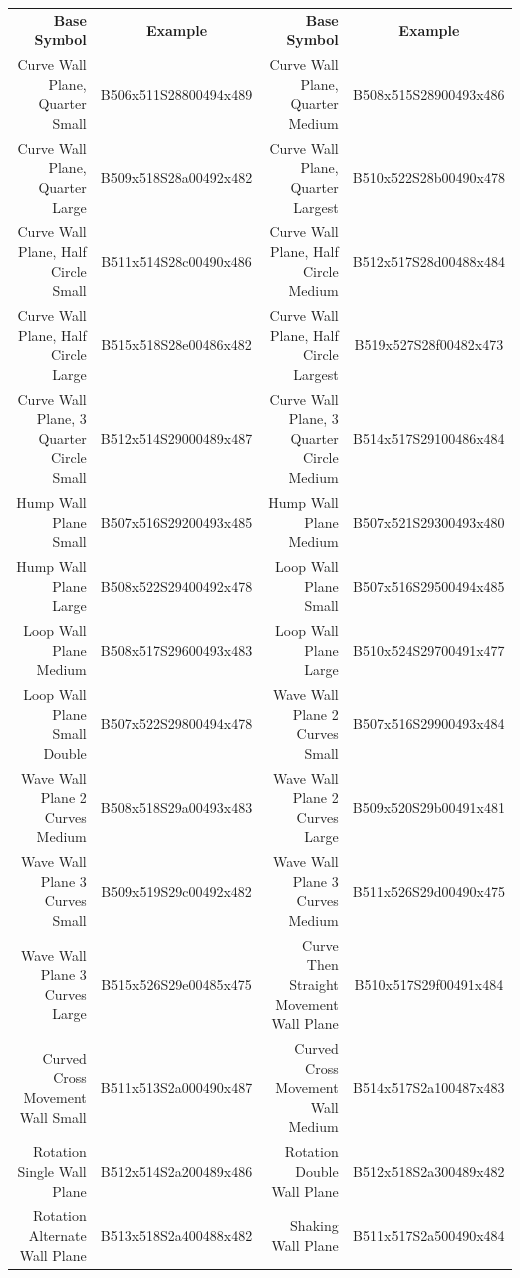 \documentclass{article}
\begin{document}
\begin{center}
\begin{tabular}{rcrc}
\textbf{Base Symbol}&\textbf{Example}&\textbf{Base Symbol}&\textbf{Example}\\
Curve Wall Plane, Quarter Small         &B506x511S28800494x489&Curve Wall Plane, Quarter Medium         &B508x515S28900493x486\\
Curve Wall Plane, Quarter Large         &B509x518S28a00492x482&Curve Wall Plane, Quarter Largest        &B510x522S28b00490x478\\
Curve Wall Plane, Half Circle Small     &B511x514S28c00490x486&Curve Wall Plane, Half Circle Medium     &B512x517S28d00488x484\\
Curve Wall Plane, Half Circle Large     &B515x518S28e00486x482&Curve Wall Plane, Half Circle Largest    &B519x527S28f00482x473\\
Curve Wall Plane, 3 Quarter Circle Small&B512x514S29000489x487&Curve Wall Plane, 3 Quarter Circle Medium&B514x517S29100486x484\\
Hump Wall Plane Small                   &B507x516S29200493x485&Hump Wall Plane Medium                   &B507x521S29300493x480\\
Hump Wall Plane Large                   &B508x522S29400492x478&Loop Wall Plane Small                    &B507x516S29500494x485\\
Loop Wall Plane Medium                  &B508x517S29600493x483&Loop Wall Plane Large                    &B510x524S29700491x477\\
Loop Wall Plane Small Double            &B507x522S29800494x478&Wave Wall Plane 2 Curves Small           &B507x516S29900493x484\\
Wave Wall Plane 2 Curves Medium         &B508x518S29a00493x483&Wave Wall Plane 2 Curves Large           &B509x520S29b00491x481\\
Wave Wall Plane 3 Curves Small          &B509x519S29c00492x482&Wave Wall Plane 3 Curves Medium          &B511x526S29d00490x475\\
Wave Wall Plane 3 Curves Large          &B515x526S29e00485x475&Curve Then Straight Movement Wall Plane  &B510x517S29f00491x484\\
Curved Cross Movement Wall Small        &B511x513S2a000490x487&Curved Cross Movement Wall Medium        &B514x517S2a100487x483\\
Rotation Single Wall Plane              &B512x514S2a200489x486&Rotation Double Wall Plane               &B512x518S2a300489x482\\
Rotation Alternate Wall Plane           &B513x518S2a400488x482&Shaking Wall Plane                       &B511x517S2a500490x484\\
\end{tabular}
\end{center}
\end{document}
